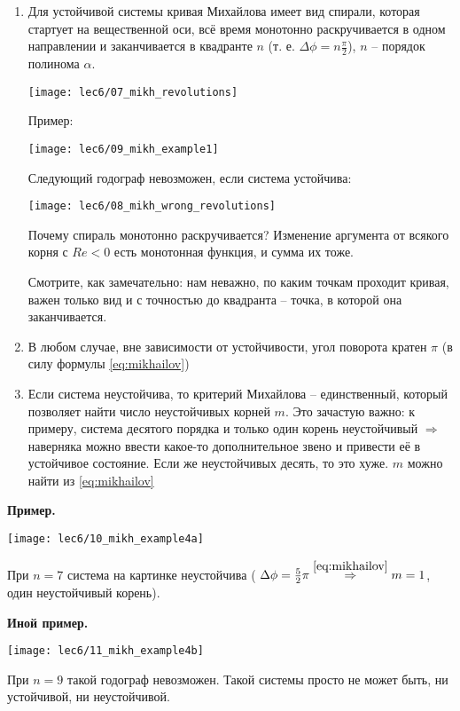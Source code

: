 \documentclass[main.tex]{subfiles}
\begin{document}
\begin{enumerate}[noitemsep]
	\item Для устойчивой системы кривая Михайлова имеет вид спирали, которая стартует на вещественной оси, всё время монотонно раскручивается в одном направлении и заканчивается в квадранте $ n $ (т. е. $ \Delta \phi = n\frac{\pi}{2} $), $n$ -- порядок полинома $\alpha$.

    \texttt{[image: lec6/07\_mikh\_revolutions]}

    Пример:

    \texttt{[image: lec6/09\_mikh\_example1]}

    Следующий годограф невозможен, если система устойчива:

    \texttt{[image: lec6/08\_mikh\_wrong\_revolutions]}

	Почему спираль монотонно раскручивается?
	Изменение аргумента от всякого корня с $ Re < 0 $ есть монотонная функция, и сумма их тоже.

    Смотрите, как замечательно:
    нам неважно, по каким точкам проходит кривая, важен только вид и с точностью до квадранта -- точка, в которой она заканчивается.
	\item В любом случае, вне зависимости от устойчивости, угол поворота кратен $ \pi $ (в силу формулы \eqref{eq:mikhailov})
	\item Если система неустойчива, то критерий Михайлова -- единственный, который позволяет найти число неустойчивых корней $ m $.
    Это зачастую важно: к примеру, система десятого порядка и только один корень неустойчивый $ \Rightarrow $ наверняка можно ввести какое-то дополнительное звено и привести её в устойчивое состояние.
    Если же неустойчивых десять, то это хуже.
	$m$ можно найти из \eqref{eq:mikhailov}
\end{enumerate}

\textbf{Пример.}

\texttt{[image: lec6/10\_mikh\_example4a]}

При $ n = 7 $ система на картинке неустойчива ( $ \Delta \phi = \frac{5}{2} \pi \overset{\eqref{eq:mikhailov}}\Rightarrow m = 1 $, один неустойчивый корень).

\textbf{Иной пример.}

\texttt{[image: lec6/11\_mikh\_example4b]}

При $ n = 9 $ такой годограф невозможен.
Такой системы просто не может быть, ни устойчивой, ни неустойчивой.
\end{document}
